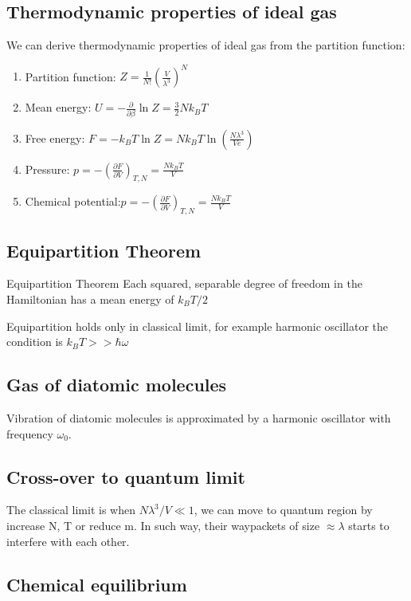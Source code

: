 \documentclass[12pt,a4paper]{article}
\begin{document}
    \subsection{Thermodynamic properties of ideal gas}
    We can derive thermodynamic properties of ideal gas from the partition function:
    \begin{enumerate}
        \item Partition function: $Z=\frac{1}{N !}\left(\frac{V}{\lambda^3}\right)^N $
        \item Mean energy: $U=-\frac{\partial}{\partial \beta} \ln Z=\frac{3}{2} N k_B T$
        \item Free energy: $F=-k_B T \ln Z = N k_B T \ln \left(\frac{N \lambda^3}{V e}\right)$
        \item Pressure: $p=-\left(\frac{\partial F}{\partial V}\right)_{T, N}=\frac{N k_B T}{V}$
        \item Chemical potential:$p=-\left(\frac{\partial F}{\partial V}\right)_{T, N}=\frac{N k_B T}{V}$
    \end{enumerate}
    
    \subsection {Equipartition Theorem}
    \begin{theorem}
        {Equipartition Theorem}
        {Each squared, separable degree of freedom in the Hamiltonian has a mean energy of $k_BT/2$}
    \end{theorem}
    Equipartition holds only in classical limit, for example harmonic oscillator  the condition is $k_B T>>\hbar\omega$
    \subsection{Gas of diatomic molecules}
    Vibration of diatomic molecules is approximated by a harmonic oscillator with frequency $\omega_0$.\\
    \subsection{Cross-over to quantum limit}
    The classical limit is when $N \lambda^3 / V \ll 1$, we can move to quantum region by increase N, T or reduce m. In such way, their waypackets of size $\approx \lambda$ starts to interfere with each other.\\

\subsection{Chemical equilibrium}
\end{document}
